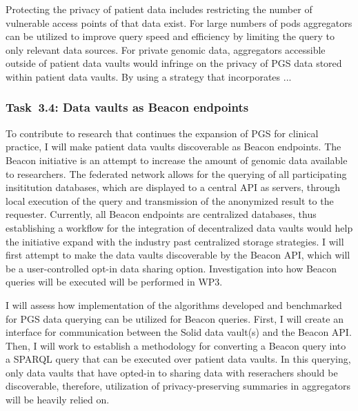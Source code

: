 \documentclass[a4paper,11pt]{article}
\begin{document}
\begin{refsection}
Protecting the privacy of patient data includes restricting the number of vulnerable access points of that data exist.
For large numbers of pods aggregators can be utilized to improve query speed and efficiency by limiting the query to only relevant data sources.
For private genomic data, aggregators accessible outside of patient data vaults would infringe on the privacy of PGS data stored within patient data vaults.
By using a strategy that incorporates ...


\newcommand\WPcd{Data vaults as Beacon endpoints}
\subsubsection{Task~3.4: \WPcd}

To contribute to research that continues the expansion of PGS for clinical practice, I will make patient data vaults discoverable as Beacon endpoints.
The Beacon initiative is an attempt to increase the amount of genomic data available to researchers.
The federated network allows for the querying of all participating insititution databases, which are displayed to a central API as servers, through local execution of the query and transmission of the anonymized result to the requester.
Currently, all Beacon endpoints are centralized databases, thus establishing a workflow for the integration of decentralized data vaults would help the initiative expand with the industry past centralized storage strategies.
I will first attempt to make the data vaults discoverable by the Beacon API, which will be a user-controlled opt-in data sharing option.
Investigation into how Beacon queries will be executed will be performed in WP3.

I will assess how implementation of the algorithms developed and benchmarked for PGS data querying can be utilized for Beacon queries. 
First, I will create an interface for communication between the Solid data vault(s) and the Beacon API. 
Then, I will work to establish a methodology for converting a Beacon query into a SPARQL query that can be executed over patient data vaults.
In this querying, only data vaults that have opted-in to sharing data with reserachers should be discoverable, therefore, utilization of privacy-preserving summaries in aggregators will be heavily relied on.



\end{refsection}
\end{document}
